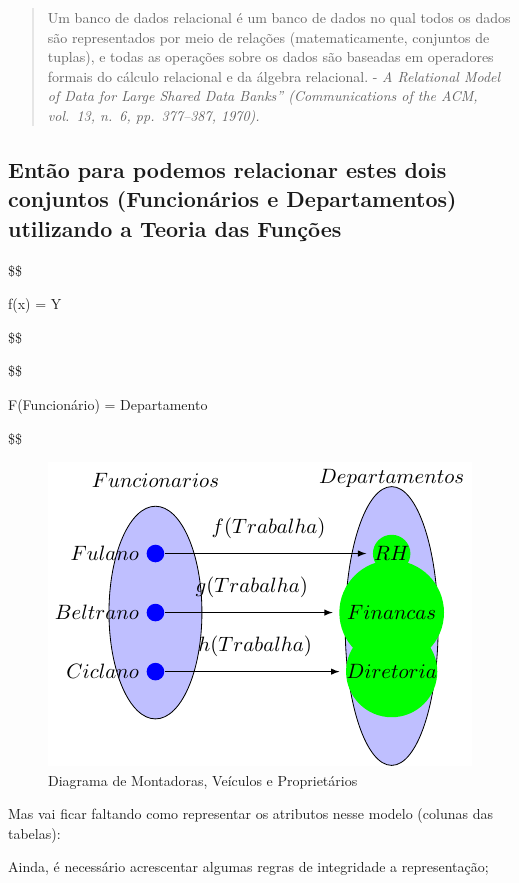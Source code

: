 \documentclass[
]{book}
\begin{document}
\begin{quote}
Um banco de dados relacional é um banco de dados no qual todos os dados são representados por meio de relações (matematicamente, conjuntos de tuplas), e todas as operações sobre os dados são baseadas em operadores formais do cálculo relacional e da álgebra relacional. - \emph{A Relational Model of Data for Large Shared Data Banks'' (Communications of the ACM, vol.~13, n.~6, pp.~377--387, 1970).}
\end{quote}

\subsection{Então para podemos relacionar estes dois conjuntos (Funcionários e Departamentos) utilizando a Teoria das Funções}\label{entuxe3o-para-podemos-relacionar-estes-dois-conjuntos-funcionuxe1rios-e-departamentos-utilizando-a-teoria-das-funuxe7uxf5es}

\$\$

f(x) = Y

\$\$

\$\$

F(Funcionário) = Departamento

\$\$

\begin{figure}
\centering
\includegraphics{2025-GTI-Sem-BancoDeDados_files/figure-latex/tikz-diagrama10-1.pdf}
\caption{\label{fig:tikz-diagrama10}Diagrama de Montadoras, Veículos e Proprietários}
\end{figure}

Mas vai ficar faltando como representar os atributos nesse modelo (colunas das tabelas):

Ainda, é necessário acrescentar algumas regras de integridade a representação;
\end{document}
